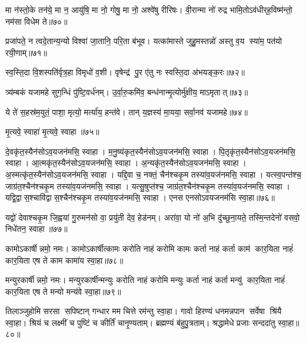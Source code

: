 मा न॑स्तो॒के तन॑ये॒ मा न॒ आयु॑षि॒ मा नो॒ गोषु॒ मा नो॒ अश्वे॑षु रीरिषः। 
वी॒रान्मा नो॑ रुद्र भामि॒तोऽव॑धीर्‌ह॒विष्म॑न्तो॒ नम॑सा विधेम ते॥७०॥
\anuvakamend 

प्रजा॑पते॒ न त्वदे॒तान्य॒न्यो विश्वा॑ जा॒तानि॒ परि॒ता ब॑भूव। 
यत्का॑मास्ते जुहु॒मस्तन्नो॑ अस्तु व॒य स्या॑म॒ पत॑यो रयी॒णाम्॥७१॥
\anuvakamend 

स्व॒स्ति॒दा वि॒शस्पति॑र्वृत्र॒हा विमृधो॑ व॒शी। 
वृषेन्द्र॑ पु॒र ए॑तु नः स्वस्ति॒दा अ॑भयङ्क॒रः॥७२॥
\anuvakamend 

त्र्य॑म्बकं यजामहे सुग॒न्धिं पु॑ष्टि॒वर्ध॑नम्। 
उ॒र्वा॒रु॒कमि॑व॒ बन्ध॑नान्मृ॒त्योर्मु॑क्षीय॒ माऽमृतात्॥७३॥
\anuvakamend 

ये ते॑ स॒हस्र॑म॒युतं॒ पाशा॒ मृत्यो॒ मर्त्या॑य॒ हन्त॑वे। 
तान् य॒ज्ञस्य॑ मा॒यया॒ सर्वा॒नव॑ यजामहे॥७४॥\anuvakamend
 
मृ॒त्यवे॒ स्वाहा॑ मृ॒त्यवे॒ स्वाहा॥७५॥%
\anuvakamend 

दे॒वकृ॑त॒स्यैन॑सोऽव॒यजन॑मसि॒ स्वाहा। 
म॒नु॒ष्य॑कृत॒स्यैन॑सो\-ऽव॒यजन॑मसि॒ स्वाहा। 
पि॒तृकृ॑त॒स्यैन॑सो\-ऽव॒यजन॑मसि॒ स्वाहा। 
आ॒त्मकृ॑त॒स्यैन॑सो\-ऽव॒यजन॑मसि॒ स्वाहा। 
अ॒न्यकृ॑त॒स्यैन॑सो\-ऽव॒यजन॑मसि॒ स्वाहा। 
अ॒स्मत्कृ॑त॒स्यैन॑सो\-ऽव॒यजन॑मसि॒ स्वाहा। 
यद्दि॒वा च॒ नक्तं॒ चैन॑श्चकृ॒म तस्या॑व॒यज॑नमसि॒ स्वाहा। 
यत्स्व॒पन्त॑श्च॒ जाग्र॑त॒श्चैन॑श्चकृ॒म तस्या॑व॒यज॑नमसि॒ स्वाहा। 
यत्सु॒षुप्त॑श्च॒ जाग्र॑त॒श्चैन॑श्चकृ॒म तस्या॑व॒यज॑नमसि॒ स्वाहा। 
यद्वि॒द्वास॒श्चावि॑द्वास॒श्चैन॑श्चकृ॒म तस्या॑व॒यज॑नमसि॒ स्वाहा। 
एनस एनसोऽवयजनम॑सि स्वा॒हा॥७६॥\anuvakamend

यद्वो॑ देवाश्चकृ॒म जि॒ह्वया॑ गु॒रुमन॑सो वा॒ प्रयु॑ती देव॒ हेड॑नम्। 
अरा॑वा॒ यो नो॑ अ॒भि दु॑च्छुना॒यते॒ तस्मि॒न्तदेनो॑ वसवो॒ निधे॑तन॒ स्वाहा॥७७॥ 
\anuvakamend



कामोऽकार्\mbox{}षीन्नमो॒ नमः। 
 कामोऽकार्\mbox{}षीत्कामः करोति नाहं करोमि कामः कर्ता नाहं कर्ता काम॑ कार॒यिता नाहं॑ कार॒यिता एष ते काम कामा॑य स्वा॒हा॥७८॥
\anuvakamend

मन्युरकार्\mbox{}षीन्नमो॒ नमः। 
मन्युरकार्\mbox{}षीन्मन्युः करोति नाहं करोमि मन्युः कर्ता नाहं कर्ता मन्यु॑ कार॒यिता नाहं॑ कार॒यिता एष ते मन्यो मन्य॑वे स्वा॒हा॥७९॥
\anuvakamend

तिलाञ्जुहोमि सरसा सपिष्टान् गन्धार मम चित्ते रम॑न्तु स्वा॒हा। 
गावो हिरण्यं धनमन्नपान सर्वेषा श्रि॑यै स्वा॒हा। 
श्रियं च लक्ष्मीं च पुष्टिं च कीर्तिं॑ चानृ॒ण्यताम्। 
ब्रह्मण्यं ब॑हुपु॒त्रताम्। 
श्रद्धामेधे प्रजाः सन्ददा॑तु स्वा॒हा॥८०॥
\anuvakamend

